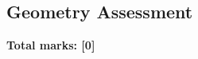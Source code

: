 \documentclass[../c1]{subfiles}
\begin{document}
\subsection*{Geometry Assessment}
\thispagestyle{fancy}



\begin{flushright}
\textbf{Total marks: [0]}
\end{flushright}
\end{document}
